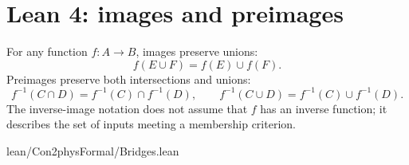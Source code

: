 \section{Lean 4: images and preimages}
\label{sec:lean-bridge-06}
For any function $f:A\to B$, images preserve unions:
\[
f(E\cup F)=f(E)\cup f(F).
\]
Preimages preserve both intersections and unions:
\[
f^{-1}(C\cap D)=f^{-1}(C)\cap f^{-1}(D),\qquad
f^{-1}(C\cup D)=f^{-1}(C)\cup f^{-1}(D).
\]
The inverse-image notation does not assume that $f$ has an inverse
function; it describes the set of inputs meeting a membership criterion.


{lean/Con2physFormal/Bridges.lean}
